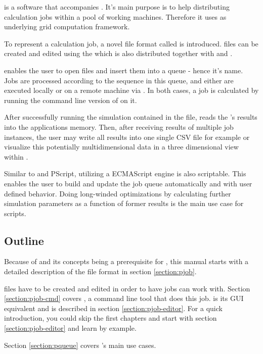 \PQUEUE{} is a software that accompanies \PHO{}.
It's main purpose is to help distributing \PHO{} calculation jobs within a pool of working machines.
Therefore it uses \Condor{} as underlying grid computation framework.\bb

To represent a \PHO{} calculation job, a novel file format called  is introduced.
\PJOB{} files can be created and edited using the  which is also distributed together with \PHO{} and \PQUEUE{}.\bb

\PQUEUE{} enables the user to open \PJOB{} files and insert them into a queue - hence it's name.
Jobs are processed according to the sequence in this queue,
and either are executed locally or on a remote machine via \Condor.
In both cases, a job is calculated by running the command line version of \PHO{} on it.\bb

After successfully running the simulation contained in the \PJOB{} file,
\PQUEUE{} reads the \PJOB's results into the applications memory.
Then, after receiving results of multiple job instances, the user may write all results into one single CSV file for example
or visualize this potentially multidimensional data in a three dimensional view within \PQUEUE.\bb

Similar to \PHO{} and PScript, utilizing a ECMAScript engine \PQUEUE{} is also scriptable.
This enables the user to build and update the job queue automatically and with user defined behavior.
Doing long-winded optimizations by calculating further simulation parameters as a function of former results
is the main use case for \PQUEUE{} scripts.\bb



\subsection{Outline}

Because of \PJOB{} and its concepts being a prerequisite for \PQUEUE{},
this manual starts with a detailed description of the \PJOB{} file format in section \ref{section:pjob}.

\PJOB{} files have to be created and edited in order to have jobs \PQUEUE{} can work with.
Section \ref{section:pjob-cmd} covers , a command line tool that does this job.
 is its GUI equivalent and is described in section \ref{section:pjob-editor}.
For a quick introduction, you could skip the first chapters and start with section \ref{section:pjob-editor}
and learn by example.

Section \ref{section:pqueue} covers \PQUEUE's main use cases. 